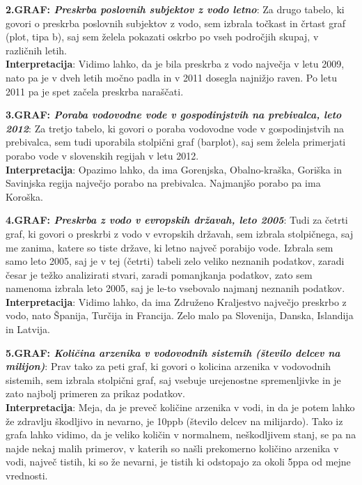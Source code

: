 \documentclass[11pt,a4paper]{article}
\begin{document}
\newpage
\textbf{2.GRAF: \emph{Preskrba poslovnih subjektov z vodo letno}}: Za drugo tabelo, ki govori o preskrba poslovnih subjektov z vodo, sem izbrala točkast in črtast graf (plot, tipa b), saj sem želela pokazati oskrbo po vseh področjih skupaj, v različnih letih.\\
\textbf{Interpretacija}: Vidimo lahko, da je bila preskrba z vodo največja v letu 2009, nato pa je v dveh letih močno padla in v 2011 dosegla najnižjo raven. Po letu 2011 pa je spet začela preskrba naraščati.\\


\newpage
\textbf{3.GRAF: \emph{Poraba vodovodne vode v gospodinjstvih na prebivalca, leto 2012}}: Za tretjo tabelo, ki govori o poraba vodovodne vode v gospodinjstvih na prebivalca, sem tudi uporabila stolpični graf (barplot), saj sem želela primerjati porabo vode v slovenskih regijah v letu 2012. \\
\textbf{Interpretacija}: Opazimo lahko, da ima Gorenjska, Obalno-kraška, Goriška in Savinjska regija največjo porabo na prebivalca. Najmanjšo porabo pa ima Koroška.\\


\newpage
\textbf{4.GRAF: \emph{Preskrba z vodo v evropskih državah, leto 2005}}: Tudi za četrti graf, ki govori o preskrbi z vodo v evropskih državah, sem izbrala stolpičnega, saj me zanima, katere so tiste države, ki letno največ porabijo vode. Izbrala sem samo leto 2005, saj je v tej (četrti) tabeli zelo veliko neznanih podatkov, zaradi česar je težko analizirati stvari, zaradi pomanjkanja podatkov, zato sem namenoma izbrala leto 2005, saj je le-to vsebovalo najmanj neznanih podatkov.\\
\textbf{Interpretacija}: Vidimo lahko, da ima Združeno Kraljestvo največjo preskrbo z vodo, nato Španija, Turčija in Francija. Zelo malo pa Slovenija, Danska, Islandija in Latvija.\\


\newpage
\textbf{5.GRAF: \emph{Količina arzenika v vodovodnih sistemih (število delcev na milijon)}}: Prav tako za peti graf, ki govori o kolicina arzenika v vodovodnih sistemih, sem izbrala stolpični graf, saj vsebuje urejenostne spremenljivke in je zato najbolj primeren za prikaz podatkov.\\
\textbf{Interpretacija}: Meja, da je preveč količine arzenika v vodi, in da je potem lahko že zdravlju škodljivo in nevarno, je 10ppb (število delcev na milijardo). Tako iz grafa lahko vidimo, da je veliko količin v normalnem, neškodljivem stanj, se pa na najde nekaj malih primerov, v katerih so našli prekomerno količino arzenika v vodi, največ tistih, ki so že nevarni, je tistih ki odstopajo za okoli 5ppa od mejne vrednosti.\\
\end{document}
